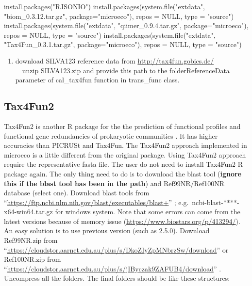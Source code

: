 \documentclass[
]{book}
\newenvironment{Shaded}{\begin{snugshade}}{\end{snugshade}}
\newcommand{\AttributeTok}[1]{\textcolor[rgb]{0.77,0.63,0.00}{#1}}
\newcommand{\ConstantTok}[1]{\textcolor[rgb]{0.00,0.00,0.00}{#1}}
\newcommand{\FunctionTok}[1]{\textcolor[rgb]{0.00,0.00,0.00}{#1}}
\newcommand{\NormalTok}[1]{#1}
\newcommand{\StringTok}[1]{\textcolor[rgb]{0.31,0.60,0.02}{#1}}
\providecommand{\tightlist}{%
  \setlength{\itemsep}{0pt}\setlength{\parskip}{0pt}}
\begin{document}
\begin{Shaded}
\begin{Highlighting}[]
\FunctionTok{install.packages}\NormalTok{(}\StringTok{"RJSONIO"}\NormalTok{)}
\FunctionTok{install.packages}\NormalTok{(}\FunctionTok{system.file}\NormalTok{(}\StringTok{"extdata"}\NormalTok{, }\StringTok{"biom\_0.3.12.tar.gz"}\NormalTok{, }\AttributeTok{package=}\StringTok{"microeco"}\NormalTok{), }\AttributeTok{repos =} \ConstantTok{NULL}\NormalTok{, }\AttributeTok{type =} \StringTok{"source"}\NormalTok{)}
\FunctionTok{install.packages}\NormalTok{(}\FunctionTok{system.file}\NormalTok{(}\StringTok{"extdata"}\NormalTok{, }\StringTok{"qiimer\_0.9.4.tar.gz"}\NormalTok{, }\AttributeTok{package=}\StringTok{"microeco"}\NormalTok{), }\AttributeTok{repos =} \ConstantTok{NULL}\NormalTok{, }\AttributeTok{type =} \StringTok{"source"}\NormalTok{)}
\FunctionTok{install.packages}\NormalTok{(}\FunctionTok{system.file}\NormalTok{(}\StringTok{"extdata"}\NormalTok{, }\StringTok{"Tax4Fun\_0.3.1.tar.gz"}\NormalTok{, }\AttributeTok{package=}\StringTok{"microeco"}\NormalTok{), }\AttributeTok{repos =} \ConstantTok{NULL}\NormalTok{, }\AttributeTok{type =} \StringTok{"source"}\NormalTok{)}
\end{Highlighting}
\end{Shaded}

\begin{enumerate}
\def\labelenumi{\arabic{enumi}.}
\setcounter{enumi}{1}
\tightlist
\item
  download SILVA123 reference data from \url{http://tax4fun.gobics.de/}\\
  　unzip SILVA123.zip and provide this path to the folderReferenceData parameter of cal\_tax4fun function in trans\_func class.
\end{enumerate}

\hypertarget{tax4fun2}{%
\subsection{Tax4Fun2}\label{tax4fun2}}

Tax4Fun2 is another R package for the the prediction of functional profiles and functional gene redundancies of prokaryotic communities \citep{Wemheuer_Tax4Fun2_2020}.
It has higher accuracies than PICRUSt and Tax4Fun. The Tax4Fun2 approach implemented in microeco is a little different from the original package.
Using Tax4Fun2 approach require the representative fasta file.
The user do not need to install Tax4Fun2 R package again.
The only thing need to do is to download the blast tool (\textbf{ignore this if the blast tool has been in the path}) and Ref99NR/Ref100NR database (select one).
Download blast tools from ``\url{https://ftp.ncbi.nlm.nih.gov/blast/executables/blast+}'' ; e.g.~ncbi-blast-****-x64-win64.tar.gz for windows system.
Note that some errors can come from the latest versions because of memory issue (\url{https://www.biostars.org/p/413294/}).
An easy solution is to use previous version (such as 2.5.0).
Download Ref99NR.zip from ``\url{https://cloudstor.aarnet.edu.au/plus/s/DkoZIyZpMNbrzSw/download}'' or Ref100NR.zip from ``\url{https://cloudstor.aarnet.edu.au/plus/s/jIByczak9ZAFUB4/download}'' .
Uncompress all the folders. The final folders should be like these structures:
\end{document}
